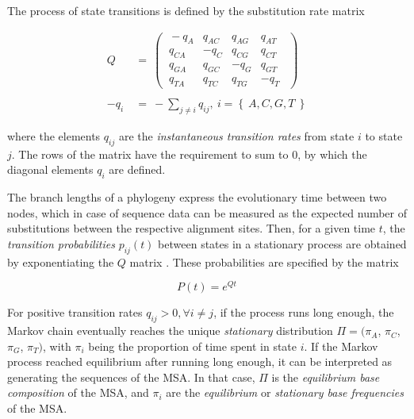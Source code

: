 The process of state transitions is defined by the substitution rate matrix %

\begin{equation}
    \begin{align*}
        Q ~&=~
         \begin{pmatrix}
         ~-q_{A}   &   q_{AC}   &   q_{AG}   &   q_{AT}~~ \\
         ~q_{CA}   &  -q_{C}    &   q_{CG}   &   q_{CT}~~ \\
         ~q_{GA}   &   q_{GC}   &  -q_{G}    &   q_{GT}~~ \\
         ~q_{TA}   &   q_{TC}   &   q_{TG}   &  -q_{T}~~
         \end{pmatrix}
        \\ \\
        - q_{i} ~&=~ - \sum_{j \neq i} q_{ij}, ~ i = \left\{~ A, C, G, T ~\right\}
    \end{align*}
\end{equation}

where the elements $q_{ij}$ are the \emph{instantaneous transition rates} from state $i$ to state $j$.
The rows of the matrix have the requirement to sum to $0$,
by which the diagonal elements $q_{i}$ are defined.

The branch lengths of a phylogeny express the evolutionary time between two nodes,
which in case of sequence data can be measured as
the expected number of substitutions between the respective alignment sites.
Then, for a given time $t$, the \emph{transition probabilities} $p_{ij}(t)$ between states in a stationary process
are obtained by exponentiating the $Q$ matrix \cite{Yang2014}.
These probabilities are specified by the matrix

\begin{equation}
    P(t) = e^{Qt}
\end{equation}

For positive transition rates $q_{ij} > 0, \forall i \neq j$, if the process runs long enough,
the Markov chain eventually reaches the unique \emph{stationary} distribution $\Pi = (\pi_A$, $\pi_C$, $\pi_G$, $\pi_T )$,
with $\pi_i$ being the proportion of time spent in state $i$.
If the Markov process reached equilibrium after running long enough,
it can be interpreted as generating the sequences of the MSA.
In that case, $\Pi$ is the \emph{equilibrium base composition} of the MSA,
and $\pi_i$ are the \emph{equilibrium} or \emph{stationary base frequencies} of the MSA.

